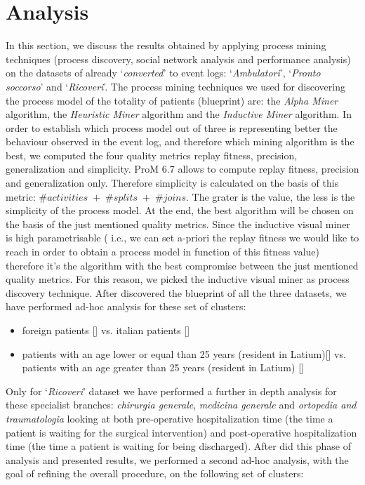 \section{Analysis} \label{analysis}
In this section, we discuss the results obtained by applying process mining techniques (process discovery, social network analysis and performance analysis) on the datasets of \hospital already `\textit{converted}' to event logs: `\textit{Ambulatori}', `\textit{Pronto soccorso}' and `\textit{Ricoveri}'. The process mining techniques we used for discovering the process model of the totality of patients (blueprint) are: the \textit{Alpha Miner} algorithm, the \textit{Heuristic Miner} algorithm and the \textit{Inductive Miner} algorithm. In order to establish which process model out of three is representing better the behaviour observed in the event log, and therefore which mining algorithm is the best, we computed the four quality metrics replay fitness, precision, generalization and simplicity. ProM 6.7 allows to compute replay fitness, precision and generalization only. Therefore simplicity is calculated on the basis of this metric: \#$activities \;+\;$\#$splits \;+\; $\#$joins$. The grater is the value, the less is the simplicity of the process model. At the end, the best algorithm will be chosen on the basis of the just mentioned quality metrics. Since the inductive visual miner is high parametrisable ( i.e., we can set a-priori the replay fitness we would like to reach in order to obtain a process model in function of this fitness value) therefore it's the algorithm with the best compromise between the just mentioned quality metrics. For this reason, we picked the inductive visual miner as process discovery technique. After discovered the blueprint of all the three datasets, we have performed ad-hoc analysis for these set of clusters:
\begin{itemize}
\item foreign patients [] vs. italian patients []
\item patients with an age lower or equal than 25 years (resident in Latium)[] vs. patients with an age greater than 25 years (resident in Latium) []
\end{itemize}
Only for `\textit{Ricoveri}' dataset we have performed a further in depth analysis for these specialist branches: \textit{chirurgia generale}, \textit{medicina generale} and \textit{ortopedia and traumatologia} looking at both pre-operative hospitalization time (the time a patient is waiting for the surgical intervention) and post-operative hospitalization time (the time a patient is waiting for being discharged). After did this phase of analysis and presented results, we performed a second ad-hoc analysis, with the goal of refining the overall procedure, on the following set of clusters:

